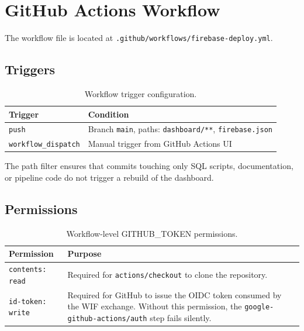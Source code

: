 \documentclass[11pt,a4paper]{article}
\theoremstyle{plainref}
\begin{document}
\section{GitHub Actions Workflow}

The workflow file is located at \texttt{.github/workflows/firebase-deploy.yml}.

\subsection{Triggers}

\begin{table}[h]
\centering
\caption{Workflow trigger configuration.}
\begin{tabular}{@{}lp{9cm}@{}}
\toprule
\textbf{Trigger} & \textbf{Condition} \\
\midrule
\texttt{push} & Branch \texttt{main}, paths: \texttt{dashboard/**}, \texttt{firebase.json} \\
\texttt{workflow\_dispatch} & Manual trigger from GitHub Actions UI \\
\bottomrule
\end{tabular}
\end{table}

The path filter ensures that commits touching only SQL scripts, documentation,
or pipeline code do not trigger a rebuild of the dashboard.

\subsection{Permissions}

\begin{table}[h]
\centering
\caption{Workflow-level GITHUB\_TOKEN permissions.}
\begin{tabular}{@{}lp{9cm}@{}}
\toprule
\textbf{Permission} & \textbf{Purpose} \\
\midrule
\texttt{contents: read} & Required for \texttt{actions/checkout} to clone the repository. \\
\texttt{id-token: write} & Required for GitHub to issue the OIDC token consumed by the WIF exchange. Without this permission, the \texttt{google-github-actions/auth} step fails silently. \\
\bottomrule
\end{tabular}
\end{table}
\end{document}
